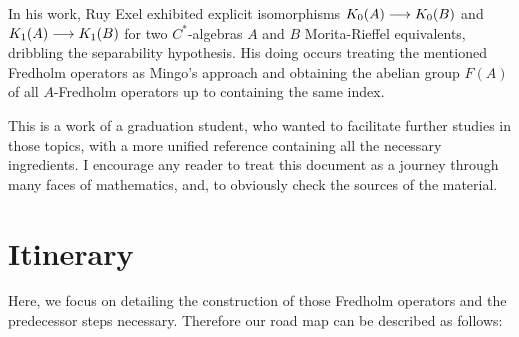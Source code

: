 In his work, Ruy Exel exhibited explicit isomorphisms $K_0(A)\longrightarrow K_0(B)$ and $K_1(A)\longrightarrow K_1(B)$ for two $C^*$-algebras $A$ and $B$ Morita-Rieffel equivalents, dribbling the separability hypothesis. His doing occurs treating the mentioned Fredholm operators as Mingo's approach \cite{mingo1987K} and obtaining the abelian group $F(A)$ of all $A$-Fredholm operators up to containing the same index. 

This is a work of a graduation student, who wanted to facilitate further studies in those topics, with a more unified reference containing all the necessary ingredients. I encourage any reader to treat this document as a journey through many faces of mathematics, and, to obviously check the sources of the material. 

\section*{Itinerary}
Here, we focus on detailing the construction of those Fredholm operators and the predecessor steps necessary. Therefore our road map can be described as follows:
